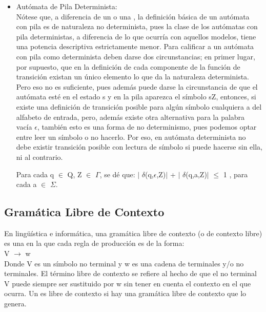 \documentclass[12pt,a4paper,spanish]{book}
\begin{document}
\begin{itemize}
La idea del funcionamiento del aut\'omata es que al ir leyendo los diferentes s\'imbolos a, estos pasan a la pila en forma de s\'imbolos A. Al aparecer el primer s\'imbolo b en la entrada, se comienza el proceso de desapilado, de forma que coincida el n\'umero de s\'imbolos b le\'idos con el n\'umero de s\'imbolos A que aparecen en la pila.\\
\item Aut\'omata de Pila Determinista:\\
\newline
N\'otese que, a diferencia de un  o una , la definici\'on b\'asica de un aut\'omata con pila es de naturaleza no determinista, pues la clase de los aut\'omatas con pila deterministas, a diferencia de lo que ocurr\'ia con aquellos modelos, tiene una potencia descriptiva estrictamente menor. Para calificar a un aut\'omata con pila como determinista deben darse dos circunstancias; en primer lugar, por supuesto, que en la definici\'on de cada componente de la funci\'on de transici\'on existan un \'unico elemento lo que da la naturaleza determinista. Pero eso no es suficiente, pues adem\'as puede darse la circunstancia de que el aut\'omata est\'e en el estado s y en la pila aparezca el s\'imbolo sZ, entonces, si existe una definici\'on de transici\'on posible para alg\'un s\'imbolo cualquiera a del alfabeto de entrada, pero, adem\'as existe otra alternativa para la palabra vac\'ia $\epsilon$, tambi\'en esto es una forma de no determinismo, pues podemos optar entre leer un s\'imbolo o no hacerlo. Por eso, en aut\'omata determinista no debe existir transici\'on posible con lectura de s\'imbolo si puede hacerse sin ella, ni al contrario.

Para cada q $\in$ Q, Z $\in$ $\Gamma$, se d\'e que: $\mid$ $\delta$(q,$\epsilon$,Z)$\mid$ + $\mid$ $\delta$(q,a,Z)$\mid$ $\le$ 1 , para cada a $\in$ $\Sigma$.
\end{itemize}

\subsection{Gram\'atica Libre de Contexto}
En ling\"{u}\'istica e inform\'atica, una gram\'atica libre de contexto (o de contexto libre) es una  en la que cada regla de producci\'on es de la forma:\\
\newline
    V $\rightarrow$ w\\
\newline
Donde V es un s\'imbolo no terminal y w es una cadena de terminales y/o no terminales. El t\'ermino libre de contexto se refiere al hecho de que el no terminal V puede siempre ser sustituido por w sin tener en cuenta el contexto en el que ocurra. Un  es libre de contexto si hay una gram\'atica libre de contexto que lo genera.
\end{document}
